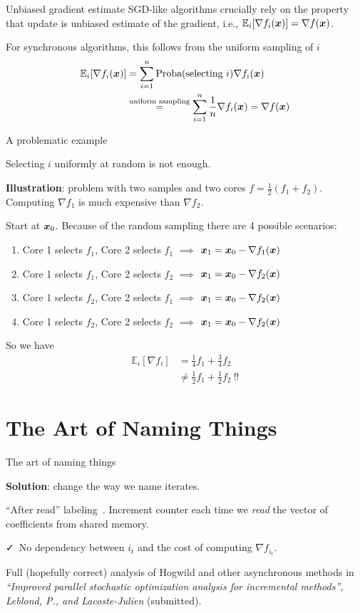 \documentclass[10pt]{beamer}
\let\oldparencite=\parencite
\renewcommand{\parencite}[1]{\textcolor[rgb]{.7,.7,.7}{\oldparencite{#1}}}
\begin{document}
\begin{frame}{Unbiased gradient estimate}
SGD-like algorithms crucially rely on the property that update is unbiased estimate of the gradient, i.e., $\mathbb{E}_i[\nabla f_i({\boldsymbol x})] = \nabla f({\boldsymbol x})$.

For synchronous algorithms, this follows from the uniform sampling of $i$ 
\begin{align*}
\mathbb{E}_i[\nabla f_i({\boldsymbol x})] &= \sum_{i=1}^n \text{Proba}(\text{selecting}~i) \nabla f_i({\boldsymbol x})\\
 &\stackrel{\text{uniform sampling}}{=} \sum_{i=1}^n \frac{1}{n} \nabla f_i({\boldsymbol x}) = \nabla f({\boldsymbol x})
\end{align*}
\end{frame}

\begin{frame}{A problematic example}

Selecting $i$ uniformly at random is not enough. 

\pause
{\bfseries Illustration}: problem with two samples and two cores $f = \frac{1}{2}(f_1 + f_2)$. Computing $\nabla f_1$ is much expensive than $\nabla f_2$.

Start at ${\boldsymbol x}_0$. Because of the random sampling there are 4 possible scenarios:
\begin{enumerate}
\item Core 1 selects $f_1$, Core 2 selects $f_1$ $\implies$ ${\boldsymbol x}_1 = {\boldsymbol x}_0 - \nabla f_1({\boldsymbol x})$
\item Core 1 selects $f_1$, Core 2 selects $f_2$ $\implies$ ${\boldsymbol x}_1 = {\boldsymbol x}_0 - \nabla f_2({\boldsymbol x})$
\item Core 1 selects $f_2$, Core 2 selects $f_1$ $\implies$ ${\boldsymbol x}_1 = {\boldsymbol x}_0 - \nabla f_2({\boldsymbol x})$
\item Core 1 selects $f_2$, Core 2 selects $f_2$ $\implies$ ${\boldsymbol x}_1 = {\boldsymbol x}_0 - \nabla f_2({\boldsymbol x})$
\end{enumerate}
So we have
\begin{align*}
\mathbb{E}_i\left[\nabla f_i\right] &= \frac{1}{4}f_1 + \frac{3}{4} f_2 \\
&\neq \frac{1}{2}f_1 + \frac{1}{2} f_2 ~!!
\end{align*}
\end{frame}

\section{The Art of Naming Things}

\begin{frame}{The art of naming things}

{\bfseries Solution}: change the way we name iterates.

\pause
``After read'' labeling~\parencite{leblond2016Asaga}. Increment counter each time we \emph{read} the vector of coefficients from shared memory.

\faCheck~No dependency between $i_t$ and the cost of computing $\nabla f_{i_t}$.

Full (hopefully correct) analysis of Hogwild and other asynchronous methods in \emph{``Improved parallel stochastic optimization analysis for
incremental methods'', Leblond, P., and Lacoste-Julien} (submitted).
\end{frame}
\end{document}
